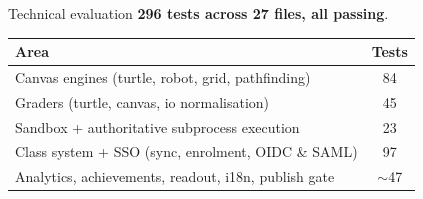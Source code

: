 \documentclass[11pt,t,usepdftitle=false,aspectratio=169]{beamer}
\begin{document}
\begin{frame}{Technical evaluation}
  \textbf{296 tests across 27 files, all passing}.
  \footnotesize
  \begin{tabularx}{\textwidth}{|X|c|}
    \hline
    \textbf{Area}                                        & \textbf{Tests} \\\hline
    Canvas engines (turtle, robot, grid, pathfinding)    & 84             \\\hline
    Graders (turtle, canvas, io normalisation)           & 45             \\\hline
    Sandbox + authoritative subprocess execution         & 23             \\\hline
    Class system + SSO (sync, enrolment, OIDC \& SAML)   & 97             \\\hline
    Analytics, achievements, readout, i18n, publish gate & $\sim$47       \\\hline
  \end{tabularx}
\end{frame}
\end{document}
